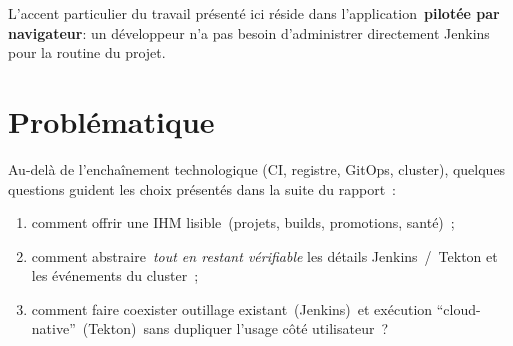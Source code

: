 L'accent particulier du travail présenté ici réside dans l'application~\textbf{pilotée par navigateur}: un développeur n'a pas besoin d'administrer directement Jenkins pour la routine du projet.

\section{Problématique}

Au-delà de l'enchaînement technologique (CI, registre, GitOps, cluster), quelques questions guident les choix présentés dans la suite du rapport~:

\begin{enumerate}[leftmargin=*]
\item comment offrir une IHM lisible~(projets, builds, promotions, santé)~;
\item comment abstraire~\emph{tout en restant vérifiable} les détails Jenkins~/~Tekton et les événements du cluster~;
\item comment faire coexister outillage existant~(Jenkins)~et exécution ``cloud-native''~(Tekton)~sans dupliquer l'usage côté utilisateur~?
\end{enumerate}

